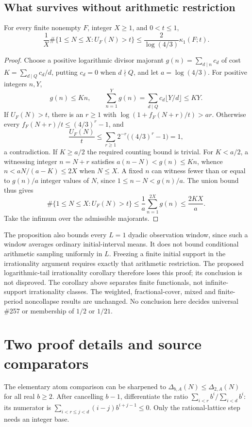 \subsection{What survives without arithmetic restriction}
\begin{prop}\label{prop:257-logarithmic-initial-interval}
For every finite nonempty $F$, integer $X\ge1$, and $0<t\le1$,
\[
 \frac1X\#\{1\le N\le X:U_F(N)>t\}
 \le\frac{2}{\log(4/3)}\kappa_1(F;t).
\]
\end{prop}
\begin{proof}
Choose a positive logarithmic divisor majorant
$g(n)=\sum_{d\mid n}c_d$ of cost $K=\sum_{d\mid Q}c_d/d$, putting
$c_d=0$ when $d\nmid Q$, and let $a=\log(4/3)$.
For positive integers $n,Y$,
\[
 g(n)\le Kn,\qquad
 \sum_{n=1}^{Y}g(n)=\sum_{d\mid Q}c_d\lfloor Y/d\rfloor\le KY.
\]
If $U_F(N)>t$, there is an $r\ge1$ with
$\log(1+f_F(N+r)/t)>ar$.
Otherwise every $f_F(N+r)/t\le(4/3)^r-1$, and
\[
 \frac{U_F(N)}t\le\sum_{r\ge1}2^{-r}\bigl((4/3)^r-1\bigr)=1,
\]
a contradiction.
If $K\ge a/2$ the required counting bound is trivial.
For $K<a/2$, a witnessing integer $n=N+r$ satisfies
$a(n-N)<g(n)\le Kn$, whence $n<aN/(a-K)\le2X$ when $N\le X$.
A fixed $n$ can witness fewer than or equal to $g(n)/a$ integer values of
$N$, since $1\le n-N<g(n)/a$.
The union bound thus gives
\[
 \#\{1\le N\le X:U_F(N)>t\}
 \le\frac1a\sum_{n=1}^{2X}g(n)\le\frac{2KX}{a}.
\]
Take the infimum over the admissible majorants.
\end{proof}

The proposition also bounds every $L=1$ dyadic observation window, since
such a window averages ordinary initial-interval means.  It does not bound
conditional arithmetic sampling uniformly in $L$.  Freezing a finite
initial support in the irrationality argument requires exactly that
arithmetic restriction.  The proposed logarithmic-tail irrationality
corollary therefore loses this proof; its conclusion is not disproved.
The corollary above separates finite functionals, not infinite-support
irrationality classes.  The weighted, fractional-cover, mixed and
finite-period noncollapse results are unchanged.  No conclusion here
decides universal \#257 or membership of $1/2$ or $1/21$.

\clearpage
\section*{Two proof details and source comparators}
The elementary atom comparison can be sharpened to
$\Delta_{b,A}(N)\le\Delta_{2,A}(N)$ for all real $b\ge2$.
After cancelling $b-1$, differentiate the ratio
$\sum_{i<r}b^i/\sum_{i<d}b^i$: its numerator is
$\sum_{i<r\le j<d}(i-j)b^{i+j-1}\le0$.
Only the rational-lattice step needs an integer base.

